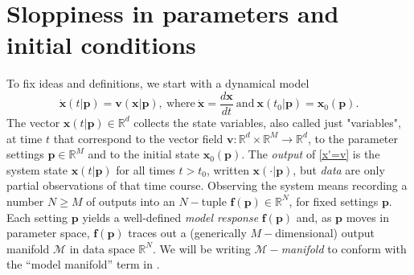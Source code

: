 










\section{Sloppiness in parameters and initial conditions}

To fix ideas and definitions, we start with a dynamical model
% 
\begin{equation}
  \dot{\mathbf{x}}(t \vert \mathbf{p})
  =
  \mathbf{v}(\mathbf{x} \vert \mathbf{p}) ,
  \ \mbox{where} \
  \dot{\mathbf{x}}
  =
  \frac{d\mathbf{x}}{dt}
  \ \mbox{and} \
  \mathbf{x}(t_0 \vert \mathbf{p}) = \mathbf{x}_0(\mathbf{p}) .
  \label{x'=v}
\end{equation}
% 
The vector $\mathbf{x}(t \vert \mathbf{p}) \in \mathbb{R}^d$ collects
the state variables, also called just "variables", at time $t$ that
correspond to the vector field
$\mathbf{v} : \mathbb{R}^d \times \mathbb{R}^M \to \mathbb{R}^d$, to
the parameter settings $\mathbf{p} \in \mathbb{R}^M$ and to the
initial state $\mathbf{x}_0(\mathbf{p})$.  The \emph{output} of
\eqref{x'=v} is the system state $\mathbf{x}(t \vert \mathbf{p})$ for
all times $t>t_0$, written $\mathbf{x}(\cdot\vert\mathbf{p})$, but
\emph{data} are only partial observations of that time course.
Observing the system means recording a number $N \ge M$ of outputs
into an $N-$tuple $\mathbf{f}(\mathbf{p}) \in \mathbb{R}^N$, for fixed
settings $\mathbf{p}$.  Each setting $\mathbf{p}$ yields a
well-defined \emph{model response} $\mathbf{f}(\mathbf{p})$ and, as
$\mathbf{p}$ moves in parameter space, $\mathbf{f}(\mathbf{p})$ traces
out a (generically $M-$dimensional) output manifold $\mathcal{M}$ in
data space $\mathbb{R}^N$.  We will be writing
$\mathcal{M}-$\emph{manifold} to conform with the ``model manifold''
term in \cite{TMS}.

